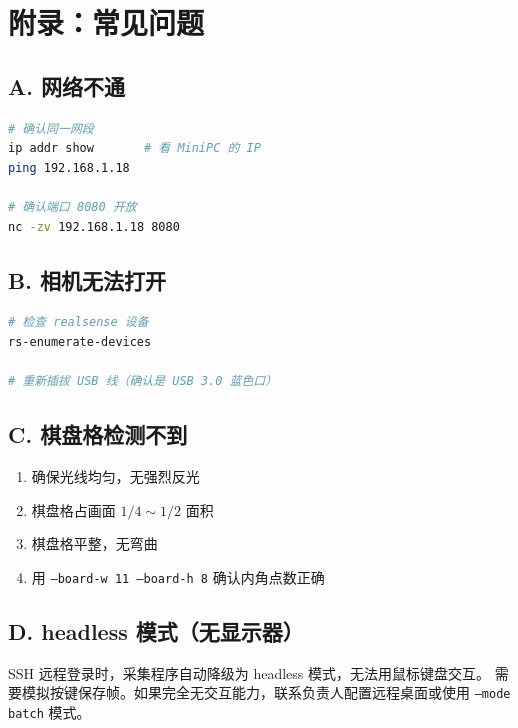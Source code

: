 \documentclass[12pt,a4paper,fontset=ubuntu]{ctexart}
\begin{document}
\section*{附录：常见问题}


\subsection*{A. 网络不通}

\begin{lstlisting}[language=bash]
# 确认同一网段
ip addr show       # 看 MiniPC 的 IP
ping 192.168.1.18

# 确认端口 8080 开放
nc -zv 192.168.1.18 8080
\end{lstlisting}

\subsection*{B. 相机无法打开}

\begin{lstlisting}[language=bash]
# 检查 realsense 设备
rs-enumerate-devices

# 重新插拔 USB 线（确认是 USB 3.0 蓝色口）
\end{lstlisting}

\subsection*{C. 棋盘格检测不到}

\begin{enumerate}[nosep]
  \item 确保光线均匀，无强烈反光
  \item 棋盘格占画面 $1/4 \sim 1/2$ 面积
  \item 棋盘格平整，无弯曲
  \item 用 \texttt{--board-w 11 --board-h 8} 确认内角点数正确
\end{enumerate}

\subsection*{D. headless 模式（无显示器）}

SSH 远程登录时，采集程序自动降级为 headless 模式，无法用鼠标键盘交互。
需要模拟按键保存帧。如果完全无交互能力，联系负责人配置远程桌面或使用
\texttt{--mode batch} 模式。
\end{document}
